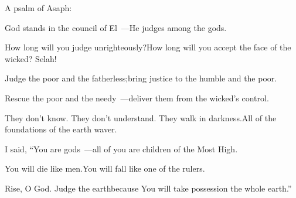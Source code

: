 
\begin{inparaenum}
  \noindent{} A psalm of Asaph:\smallskip%

  \pb{}God stands in the council of El~---\pa{}He judges among the gods.%

  \pb{} How long will you judge unrighteously?\pa{}How long will you accept the face of the wicked? Selah!%

  \pa{} Judge the%
  poor and the fatherless;\pa{}bring justice to the humble%
  and the poor.%

  \pa{} Rescue the poor and the needy~---\pa{}deliver them from the wicked's control.%

  \pb{} They don't know. They don't understand.%
  \pa{}They walk in darkness.\pa{}All of the foundations of the earth waver.%

  \pa{} I said, ``You are gods~---\pa{}all of you are children of the Most High.%

  \pa{} You will die like men.\pa{}You will fall like one of the rulers.%

  \pb{} Rise, O God. Judge the earth\pa{}because You will take possession the whole earth.''%
\end{inparaenum}

